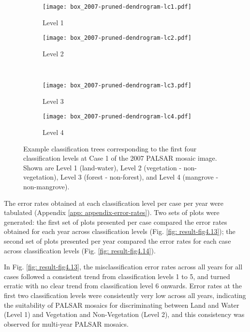 \begin{figure}[!ht] \centering
	\captionsetup[subfigure]{width=2.0in} %
	\begin{subfigure}[t]{0.49\textwidth}
		\texttt{[image: box\_2007-pruned-dendrogram-lc1.pdf]}
		\caption[Box.4]{Level 1}
		\label{fig: result-fig4.12a}
	\end{subfigure}
	\begin{subfigure}[t]{0.49\textwidth}
		\texttt{[image: box\_2007-pruned-dendrogram-lc2.pdf]}
		\caption[Box.4]{Level 2}
		\label{fig: result-fig4.12b}
	\end{subfigure}\\
	\vspace{15pt}
	\begin{subfigure}[t]{0.49\textwidth}
		\texttt{[image: box\_2007-pruned-dendrogram-lc3.pdf]}
		\caption[Box.4]{Level 3}
		\label{fig: result-fig4.12c}
	\end{subfigure}
	\begin{subfigure}[t]{0.49\textwidth}
		\texttt{[image: box\_2007-pruned-dendrogram-lc4.pdf]}
		\caption[Box.4]{Level 4}
		\label{fig: result-fig4.12d}
	\end{subfigure}
	\vspace{5pt}
	\caption[Box 4. Example classification trees corresponding to the first four classification levels at Case 1 of the 2007 PALSAR mosaic image.]{Example classification trees corresponding to the first four classification levels at Case 1 of the 2007 PALSAR mosaic image. Shown are Level 1 (land-water), Level 2 (vegetation - non-vegetation), Level 3 (forest - non-forest), and Level 4 (mangrove - non-mangrove).}
	\label{fig: result-fig4.12}
\end{figure}

The error rates obtained at each classification level per case per year were tabulated (Appendix \ref{app: appendix-error-rates}). Two sets of plots were generated: the first set of plots presented per case compared the error rates obtained for each year across classification levels (Fig. \ref{fig: result-fig4.13}); the second set of plots presented per year compared the error rates for each case across classification levels (Fig. \ref{fig: result-fig4.14}).

In Fig. \ref{fig: result-fig4.13}, the misclassification error rates across all years for all cases followed a consistent trend from classification levels 1 to 5, and turned erratic with no clear trend from classification level 6 onwards. Error rates at the first two classification levels were consistently very low across all years, indicating the suitability of PALSAR mosaics for discriminating between Land and Water (Level 1) and Vegetation and Non-Vegetation (Level 2), and this consistency was observed for multi-year PALSAR mosaics.

